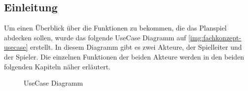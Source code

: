 \subsection{Einleitung}
\label{sec:fachkonzept-usecase-einleitung}

Um einen Überblick über die Funktionen zu bekommen, die das Planspiel abdecken sollen, wurde das folgende UseCase Diagramm auf \vref{img:fachkonzept-usecase} erstellt. In diesem Diagramm gibt es zwei Akteure, der Spielleiter und der Spieler. Die einzelnen Funktionen der beiden Akteure werden in den beiden folgenden Kapiteln näher erläutert.

\begin{figure}[h]
  \centering
  \caption{UseCase Diagramm}
  \label{img:fachkonzept-usecase}
\end{figure}

\autorende{}